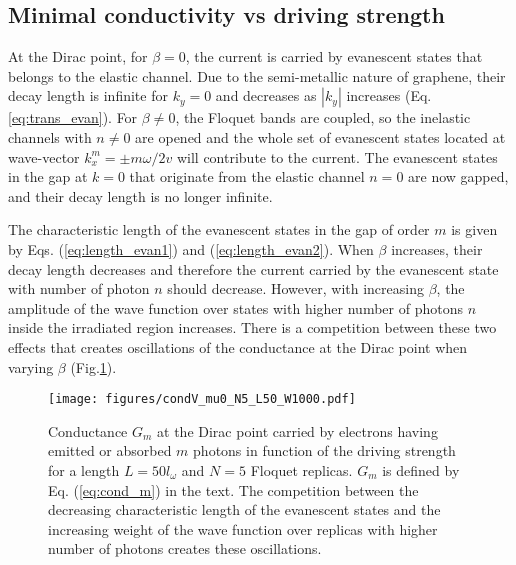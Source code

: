 \documentclass[aps,prb,showpacs,superscriptaddress,twocolumn,10pt,floatfix]{revtex4-1}
\newcommand{\ep}{\varepsilon}
\begin{document}

\subsection{Minimal conductivity vs driving strength}

At the Dirac point, for $\beta=0$, the current is carried by evanescent states that belongs to the elastic channel. Due to the semi-metallic nature of graphene, their decay length is infinite for $k_y=0$ and decreases as $|k_y|$ increases (Eq. \ref{eq:trans_evan}). For $\beta\neq0$, the Floquet bands are coupled, so the inelastic channels with $n\neq0$ are opened and the whole set of evanescent states located at wave-vector $k_x^m=\pm m\omega/2v$ will contribute to the current. The evanescent states in the gap at $k=0$ that originate from the elastic channel $n=0$ are now gapped, and their decay length is no longer infinite.

The characteristic length of the evanescent states in the gap of order $m$ is given by Eqs. (\ref{eq:length_evan1}) and (\ref{eq:length_evan2}). When $\beta$ increases, their decay length decreases and therefore the current carried by the evanescent state with number of photon $n$ should decrease. However, with increasing $\beta$, the amplitude of the wave function over states with higher number of photons $n$ inside the irradiated region increases. There is a competition between these two effects that creates oscillations of the conductance at the Dirac point when varying $\beta$ (Fig.\ref{fig:cond_V}). 


\begin{figure}[h!]
\texttt{[image: figures/condV\_mu0\_N5\_L50\_W1000.pdf]}
\caption{Conductance $G_{m}$ at the Dirac point carried by electrons having emitted or absorbed $m$ photons in function of the driving strength for a length  $L=50l_\omega$ and $N=5$ Floquet replicas. $G_{m}$ is defined by Eq. (\ref{eq:cond_m}) in the text. The competition between the decreasing characteristic length of the evanescent states and the increasing weight of the wave function over replicas with higher number of photons creates these oscillations.}
\label{fig:cond_V}
\end{figure}
\end{document}
